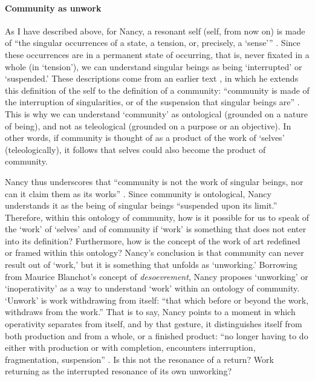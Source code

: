 \paragraph{Community as unwork}
As I have described above, for Nancy, a resonant self (self, from now on) is made of ``the singular occurrences of a state, a tension, or, precisely, a `sense''' \parencite[8]{Nan07:Lis}. Since these occurrences are in a permanent state of occurring, that is, never fixated in a whole (in `tension'), we can understand singular beings as being `interrupted' or `suspended.' These descriptions come from an earlier text \textcite{Nan91:The}, in which he extends this definition of the self to the definition of a community: ``community is made of the interruption of singularities, or of the suspension that singular beings are'' \parencite[31][All subsequent quotes from this passage.]{Nan91:The}. This is why we can understand `community' as ontological (grounded on a nature of being), and not as teleological (grounded on a purpose or an objective). In other words, if community is thought of as a product of the work of `selves' (teleologically), it follows that selves could also become the product of community. 


Nancy thus underscores that ``community is not the work of singular beings, nor can it claim them as its works'' . Since community is ontological, Nancy understands it as the being of singular beings ``suspended upon its limit.'' Therefore, within this ontology of community, how is it possible for us to speak of the `work' of `selves' and of community if `work' is something that does not enter into its definition? Furthermore, how is the concept of the work of art redefined or framed within this ontology? Nancy's conclusion is that community can never result out of `work,' but it is something that unfolds as `unworking.' Borrowing from Maurice Blanchot's concept of \textit{desoevrement}, Nancy proposes `unworking' or `inoperativity' as a way to understand `work' within an ontology of community. `Unwork' is work withdrawing from itself: ``that which before or beyond the work, withdraws from the work.'' That is to say, Nancy points to a moment in which operativity separates from itself, and by that gesture, it distinguishes itself from both production and from a whole, or a finished product: ``no longer having to do either with production or with completion, encounters interruption, fragmentation, suspension'' . Is this not the resonance of a return? Work returning as the interrupted resonance of its own unworking?

